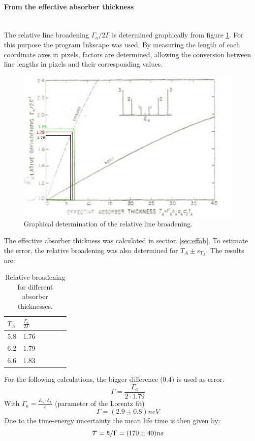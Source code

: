 \paragraph{From the effective absorber thickness} \ \\
The relative line broadening $\Gamma_a/2\Gamma$ is determined graphically from figure \ref{fig:absorberthicknessevaluated}. For this purpose the program Inkscape was used. By measuring the length of each coordinate axes in pixels, factors are determined, allowing the conversion between line lengths in pixels and their corresponding values.\\
\begin{figure}[hbp]
	\centering
	\includegraphics[width=1.0\linewidth]{graphics/absorberthicknessevaluated}
	\caption{Graphical determination of the relative line broadening. \cite{Frauenfelder}}
	\label{fig:absorberthicknessevaluated}
\end{figure}
The effective absorber thickness was calculated in section \ref{sec:effab}. To estimate the error, the relative broadening was also determined for $T_A\pm s_{T_A}$. The results are:
\begin{table}[H]\centering
	\begin{tabular}{@{}llllll@{}}
		\toprule
		$T_A$ & $\frac{\Gamma_a}{2\Gamma}$ \\
		\midrule
		5.8 & 1.76\\
		6.2 & 1.79 \\
		6.6 & 1.83 \\
	\end{tabular}
	\caption[Relative broadening]{Relative broadening for different absorber thicknesses.}
	\label{tb:relative broadening}
\end{table}
For the following calculations, the bigger difference (0.4) is used as error.
\begin{equation}
\Gamma = \frac{\Gamma_a}{2\cdot1.79}
\end{equation}
With $\Gamma_a=\frac{E_\gamma\cdot\delta_L}{c} $ (parameter of the Lorentz fit)
\begin{equation}
\Gamma=\unit{(2.9\pm0.8)}{neV}
\end{equation}
Due to the time-energy uncertainty the mean life time is then given by:
\begin{equation}
\scalebox{1.5}{$\tau$}=\hbar/\Gamma=\unit{(170\pm40)}{ns}
\end{equation}